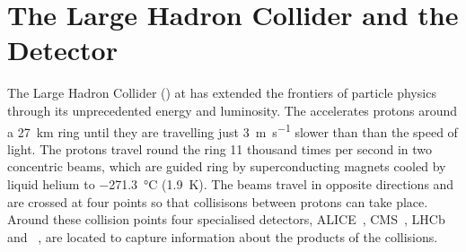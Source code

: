 \chapter{The Large Hadron Collider and the \ATLAS Detector}\label{chap:lhc_atlas}


The Large Hadron Collider (\LHC) at \CERN has extended the frontiers of particle physics through its unprecedented energy and luminosity.
The \LHC accelerates protons around a \SI{27}{\km} ring until they are travelling just \SI{3}{\m\per\s} slower than than the speed of light.
The protons travel round the ring 11 thousand times per second in two concentric beams, which are guided ring by superconducting magnets cooled by liquid helium to \SI{-271.3}{\degreeCelsius} (\SI{1.9}{\kelvin}).
The beams travel in opposite directions and are crossed at four points so that collisisons between protons can take place.
Around these collision points four specialised detectors, ALICE~\cite{AliceCollaboration_2008}, CMS~\cite{CMS-TDR-08-001}, LHCb~\cite{LHCbCollaboration_2008} and \ATLAS~\cite{PERF-2007-01}, are located to capture information about the products of the collisions.

